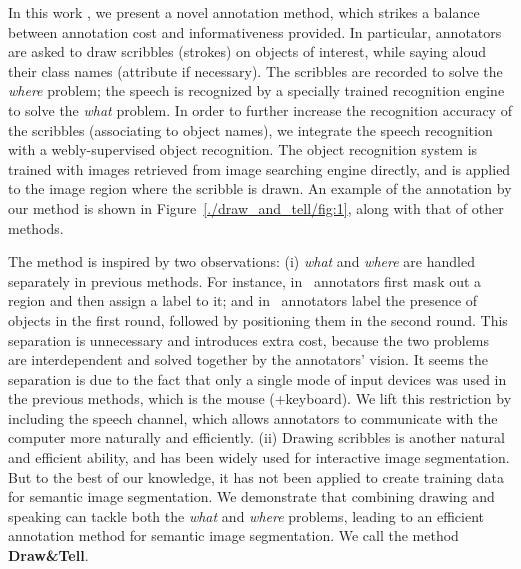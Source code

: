 In this work , we present a novel annotation method, which strikes a
balance between annotation cost and informativeness provided. In
particular, annotators are asked to draw scribbles (strokes) on objects of
interest, while saying aloud their class names (attribute if necessary). The 
scribbles are recorded to solve the \emph{where}
problem; the speech is recognized by a specially trained
recognition engine to solve the \emph{what} problem. 
In order to further increase the recognition accuracy of the scribbles 
(associating to object names), we integrate the speech recognition with a webly-supervised object recognition.  
The object recognition system is trained with images retrieved from image searching engine directly, and is applied to the image region where the scribble is drawn.  
An example of the annotation by our method is shown in Figure~\ref{./draw_and_tell/fig:1}, along with
that of other methods.

The method is inspired by two observations: (i) \emph{what} and
\emph{where} are handled separately in previous methods. For instance,
in~\citep{open:surface} annotators first mask out a region and then
assign a label to it; and in~\citep{coco:eccv} annotators
label the presence of objects in the first round, followed by positioning
them in the second round. This separation is unnecessary and
introduces extra cost, because the two problems are interdependent and
solved together by the annotators’ vision. It seems the separation is due
to the fact that only a single mode of input devices was used in the
previous methods, which is the mouse (+keyboard). We lift this
restriction by including the speech channel, which allows annotators
to communicate with the computer more naturally and efficiently. 
(ii) Drawing scribbles is another natural and efficient ability, and
has been widely used for interactive image segmentation. But to the best 
of our knowledge, it has not been applied to create training data for 
semantic image segmentation. We demonstrate that combining drawing and 
speaking can tackle both the \emph{what} and \emph{where} problems, 
leading to an efficient annotation method for semantic image segmentation.
We call the method \textbf{Draw\&Tell}.  




